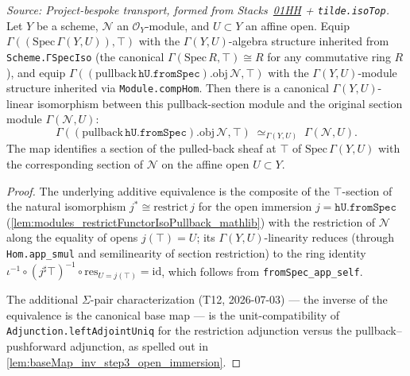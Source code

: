 \begin{lemma}\leanok
  \label{lem:pullback_of_openImmersion_iso_restrict}
  \textit{Source: Project-bespoke transport, formed from
  Stacks~\href{https://stacks.math.columbia.edu/tag/01HH}{01HH} +
  \texttt{tilde.isoTop}.}
  Let \(Y\) be a scheme, \(\mathcal N\) an \(\mathcal O_Y\)-module, and
  \(U \subset Y\) an affine open. Equip \(\Gamma((\mathrm{Spec}\,\Gamma(Y, U)),
  \top)\) with the \(\Gamma(Y, U)\)-algebra structure inherited from
  \texttt{Scheme.ΓSpecIso} (the canonical
  \(\Gamma(\mathrm{Spec}\,R, \top) \cong R\) for any commutative ring \(R\)),
  and equip
  \(\Gamma((\text{pullback}\,\mathtt{hU.fromSpec}).\mathrm{obj}\,\mathcal N,
  \top)\) with the \(\Gamma(Y, U)\)-module structure inherited via
  \texttt{Module.compHom}. Then there is a canonical \(\Gamma(Y, U)\)-linear
  isomorphism between this pullback-section module and the original section
  module \(\Gamma(\mathcal N, U)\):
  \[
    \Gamma((\text{pullback}\,\mathtt{hU.fromSpec}).\mathrm{obj}\,\mathcal N,
      \top)
    \;\simeq_{\Gamma(Y, U)}\;
    \Gamma(\mathcal N, U).
  \]
  The map identifies a section of the pulled-back sheaf at \(\top\) of
  \(\mathrm{Spec}\,\Gamma(Y, U)\) with the corresponding section of
  \(\mathcal N\) on the affine open \(U \subset Y\).
\end{lemma}
\begin{proof}
  \leanok
  The underlying additive equivalence is the composite of the
  \(\top\)-section of the natural isomorphism
  \(j^{*} \cong \mathrm{restrict}\,j\) for the open immersion
  \(j = \mathtt{hU.fromSpec}\)
  (\cref{lem:modules_restrictFunctorIsoPullback_mathlib}) with the
  restriction of \(\mathcal N\) along the equality of opens
  \(j(\top) = U\); its \(\Gamma(Y, U)\)-linearity reduces (through
  \texttt{Hom.app\_smul} and semilinearity of section restriction) to
  the ring identity
  \(\iota^{-1} \circ (j^{\sharp}\top)^{-1} \circ
    \mathrm{res}_{U = j(\top)} = \mathrm{id}\), which follows from
  \texttt{fromSpec\_app\_self}.

  The additional \(\Sigma\)-pair characterization (T12, 2026-07-03) —
  the inverse of the equivalence is the canonical base map — is the
  unit-compatibility of \texttt{Adjunction.leftAdjointUniq} for the
  restriction adjunction versus the pullback--pushforward adjunction,
  as spelled out in \cref{lem:baseMap_inv_step3_open_immersion}.
\end{proof}


